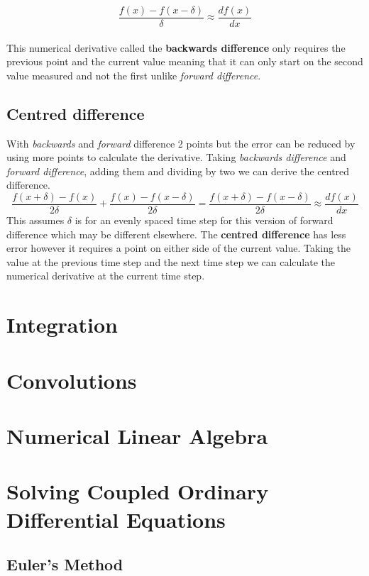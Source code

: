\documentclass{article}
\begin{document}
\begin{equation}
\frac{f(x)-f(x-\delta)}{\delta} \approx \frac{df(x)}{dx} 
\end{equation} 
\\
This numerical derivative called the \textbf{backwards difference} only requires the previous point and the current value meaning that it can only start on the second value measured and not the first unlike \emph{forward difference}.

\subsection{Centred difference}
With \emph{backwards} and \emph{forward} difference 2 points but the error can be reduced by using more points to calculate the derivative. Taking \emph{backwards difference} and \emph{forward difference}, adding them and dividing by two we can derive the centred difference.
\begin{equation}
\frac{f(x+\delta)-f(x)}{2\delta} + \frac{f(x)-f(x-\delta)}{2\delta} = \frac{f(x+\delta)-f(x-\delta)}{2\delta} \approx \frac{df(x)}{dx}
\end{equation} 
This assumes $\delta$ is for an evenly spaced time step for this version of forward difference which may be different elsewhere. The \textbf{centred difference} has less error however it requires a point on either side of the current value. Taking the value at the previous time step and the next time step we can calculate the numerical derivative at the current time step.

\section{Integration}

\section{Convolutions}

\section{Numerical Linear Algebra}

\section{Solving Coupled Ordinary Differential Equations}

\subsection{Euler's Method}
\end{document}
